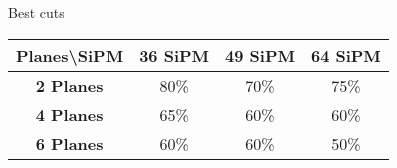 \documentclass{beamer}
\begin{document}
\begin{frame}{Best cuts}
\begin{center}
 \begin{tabular}{c|ccc|}
  \toprule
  Planes\textbackslash SiPM & \textbf{36 SiPM} & \textbf{49 SiPM} & \textbf{64 SiPM} \\
   \hline
  \textbf{2 Planes} & 80\% & 70\% & 75\% \\
  \textbf{4 Planes} & 65\% & 60\% & 60\% \\
  \textbf{6 Planes} & 60\% & 60\% & 50\% \\
    \toprule
 \end{tabular}
\end{center}
\end{frame}
\end{document}
